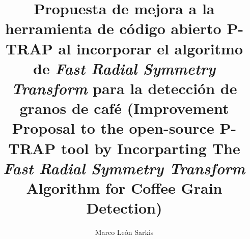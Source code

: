 \title{Propuesta de mejora a la herramienta de c\'odigo abierto P-TRAP al incorporar el algoritmo de \textit{Fast Radial Symmetry Transform} para la detecci\'on de granos de caf\'e
\newline
\newline
(Improvement Proposal to the open-source P-TRAP tool by Incorparting The \textit{Fast Radial Symmetry Transform} Algorithm for Coffee Grain Detection)}
\author{Marco Le\'on Sarkis}
\maketitle
\let\cleardoublepage\clearpage
\setcounter{savepage}{\thepage}
\begin{abstractpage}

\end{abstractpage}

